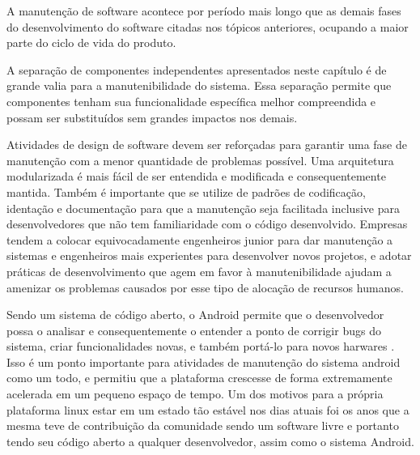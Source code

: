 A manutenção de software acontece por período mais longo que as demais fases do desenvolvimento do software citadas nos tópicos anteriores, ocupando a maior parte do ciclo de vida do produto.

A separação de componentes independentes apresentados neste capítulo é de grande valia para a manutenibilidade do sistema. Essa separação permite que componentes tenham sua funcionalidade específica melhor compreendida e possam ser substituídos sem grandes impactos nos demais. 

Atividades de design de software devem ser reforçadas para garantir uma fase de manutenção com a menor quantidade de problemas possível. Uma arquitetura modularizada é mais fácil de ser entendida e modificada e consequentemente mantida. Também é importante que se utilize de padrões de codificação, identação e documentação para que a manutenção seja facilitada inclusive para desenvolvedores que não tem familiaridade com o código desenvolvido. Empresas tendem a colocar equivocadamente engenheiros junior para dar manutenção a sistemas e engenheiros mais experientes para desenvolver novos projetos, e adotar práticas de desenvolvimento que agem em favor à manutenibilidade ajudam a amenizar os problemas causados por esse tipo de alocação de recursos humanos.

Sendo um sistema de código aberto, o Android permite que o desenvolvedor possa o analisar e consequentemente o entender a ponto de corrigir bugs do sistema, criar funcionalidades novas, e também portá-lo para novos harwares \cite{googleandroid}. Isso é um ponto importante para atividades de manutenção do sistema android como um todo, e permitiu que a plataforma crescesse de forma extremamente acelerada em um pequeno espaço de tempo. Um dos motivos para a própria plataforma linux estar em um estado tão estável nos dias atuais foi os anos que a mesma teve de contribuição da comunidade sendo um software livre e portanto tendo seu código aberto a qualquer desenvolvedor, assim como o sistema Android. 